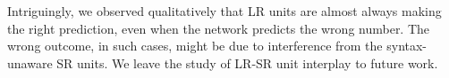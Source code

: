 Intriguingly, we observed qualitatively that LR units are almost
always making the right prediction, even when the network predicts the
wrong number. The wrong outcome, in such cases, might be due to
interference from the syntax-unaware SR units. We leave the study of LR-SR
unit interplay to future work.

